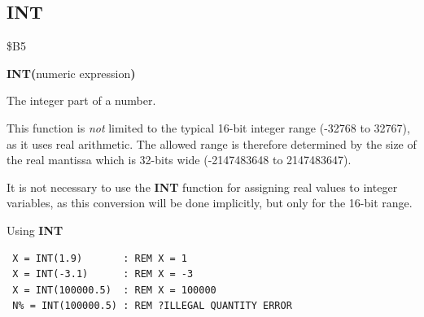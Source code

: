 
\newpage
\subsection{INT}
\begin{description}[leftmargin=2cm,style=nextline]
\item [Token:]    \$B5

\item [Format:]   {\bf INT(}numeric expression{\bf)}

\item [Returns:]  The integer part of a number.

                  This function is \emph{not} limited to the typical 16-bit integer range (-32768 to 32767), as it uses real arithmetic. The allowed range is therefore determined by the size of the real mantissa which is 32-bits wide (-2147483648 to 2147483647).

\item [Remarks:]  It is not necessary to use the {\bf INT} function for assigning real values to integer variables, as this conversion will be done implicitly, but only for the 16-bit range.

\item [Examples:] Using {\bf INT}

\begin{tcolorbox}[colback=black,coltext=white]
\verbatimfont{\codefont}
\begin{verbatim}
 X = INT(1.9)       : REM X = 1
 X = INT(-3.1)      : REM X = -3
 X = INT(100000.5)  : REM X = 100000
 N% = INT(100000.5) : REM ?ILLEGAL QUANTITY ERROR
\end{verbatim}
\end{tcolorbox}
\end{description}


\newpage
